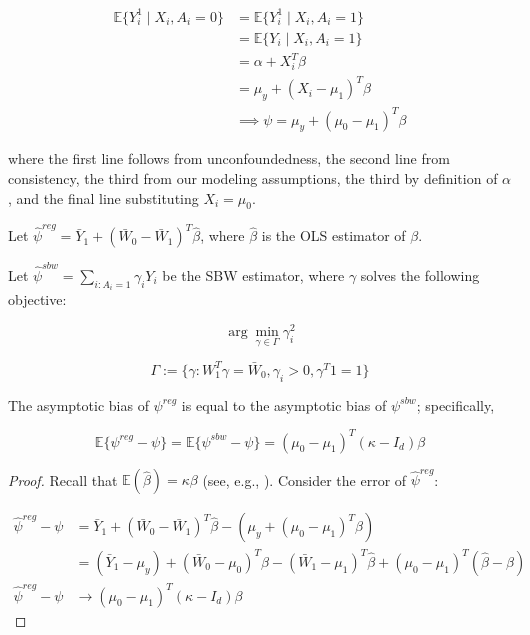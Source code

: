\documentclass{article}
\begin{document}
\begin{appendix}
\begin{align*}
\mathbb{E}\{Y_i^1 \mid X_i, A_i = 0\} &= \mathbb{E}\{Y_i^1 \mid X_i, A_i = 1\} \\ 
&= \mathbb{E}\{Y_i \mid X_i, A_i = 1\} \\
&= \alpha + X_i^T\beta \\
&= \mu_y + (X_i - \mu_1)^T\beta \\
&\implies \psi = \mu_y + (\mu_0 - \mu_1)^T\beta
\end{align*}

where the first line follows from unconfoundedness, the second line from consistency, the third from our modeling assumptions, the third by definition of $\alpha$, and the final line substituting $X_i = \mu_0$.

Let $\hat{\psi}^{reg} = \bar{Y}_1 + (\bar{W}_0 - \bar{W}_1)^T\hat{\beta}$, where $\hat{\beta}$ is the OLS estimator of $\beta$.  

Let $\hat{\psi}^{sbw} = \sum_{i: A_i = 1}\gamma_iY_i$ be the SBW estimator, where $\gamma$ solves the following objective:

$$
\arg\min_{\gamma \in \Gamma} \gamma_i^2
$$

$$
\Gamma := \{\gamma: W_1^T\gamma = \bar{W}_0, \gamma_i > 0, \gamma^T1 = 1\}
$$

\begin{claim}\label{cl1}
The asymptotic bias of $\psi^{reg}$ is equal to the asymptotic bias of $\psi^{sbw}$; specifically, 

$$
\mathbb{E}\{\psi^{reg} - \psi\} = \mathbb{E}\{\psi^{sbw} - \psi\} = (\mu_0 - \mu_1)^T(\kappa - I_d)\beta
$$
\end{claim}

\begin{proof}
Recall that $\mathbb{E}(\hat{\beta}) = \kappa\beta$ (see, e.g., \cite{gleser1992importance}). Consider the error of $\hat{\psi}^{reg}$: 

\begin{align*}
    \hat{\psi}^{reg} - \psi &= \bar{Y}_1 + (\bar{W}_0 - \bar{W}_1)^T\hat{\beta} - (\mu_y + (\mu_0 - \mu_1)^T\beta) \\
    &= (\bar{Y}_1 - \mu_y) + (\bar{W}_0 - \mu_0)^T\hat{\beta} - (\bar{W}_1 - \mu_1)^T\hat{\beta} + (\mu_0 - \mu_1)^T(\hat{\beta} - \beta) \\
    \hat{\psi}^{reg} - \psi &\to (\mu_0 - \mu_1)^T(\kappa - I_d)\beta
\end{align*}


\end{proof}
\end{appendix}
\end{document}
